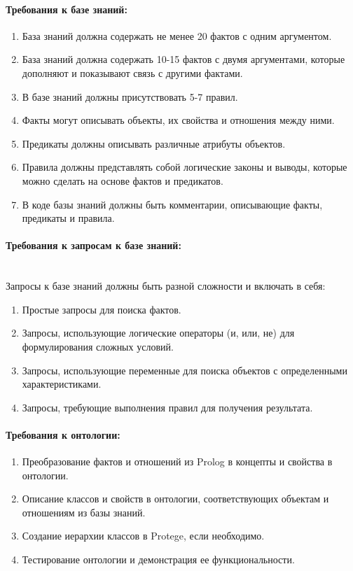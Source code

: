 \documentclass[12pt,onecolumn]{article}
\begin{document}
\paragraph{Требования к базе знаний:}
\begin{enumerate}
  \item База знаний должна содержать не менее 20 фактов с одним аргументом.
  \item База знаний должна содержать 10-15 фактов с двумя аргументами, которые дополняют и показывают связь с другими фактами.
  \item В базе знаний должны присутствовать 5-7 правил.
  \item Факты могут описывать объекты, их свойства и отношения между ними.
  \item Предикаты должны описывать различные атрибуты объектов.
  \item Правила должны представлять собой логические законы и выводы, которые можно сделать на основе фактов и предикатов.
  \item В коде базы знаний должны быть комментарии, описывающие факты, предикаты и правила.
\end{enumerate}
\paragraph{Требования к запросам к базе знаний:}\mbox{} \\
Запросы к базе знаний должны быть разной сложности и включать в себя:
\begin{enumerate}
  \item Простые запросы для поиска фактов.
  \item Запросы, использующие логические операторы (и, или, не) для формулирования сложных условий.
  \item Запросы, использующие переменные для поиска объектов с определенными характеристиками.
  \item Запросы, требующие выполнения правил для получения результата.
\end{enumerate}
\paragraph{Требования к онтологии:}
\begin{enumerate}
  \item Преобразование фактов и отношений из Prolog в концепты и свойства в онтологии.
  \item Описание классов и свойств в онтологии, соответствующих объектам и отношениям из базы знаний.
  \item Создание иерархии классов в Protege, если необходимо.
  \item Тестирование онтологии и демонстрация ее функциональности.
\end{enumerate}
\end{document}
